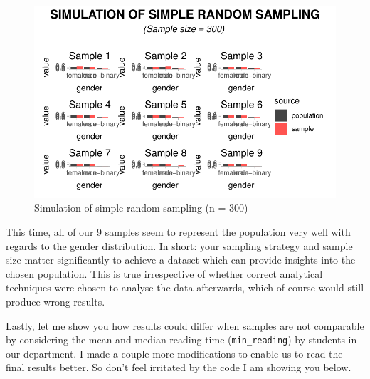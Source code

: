 \documentclass[
  letterpaper,
]{krantz}
\begin{document}
\begin{figure}[H]

{\centering \includegraphics{09_sources_of_bias_files/figure-pdf/drawing-samples-of-300-1.pdf}

}

\caption{Simulation of simple random sampling (n = 300)}

\end{figure}%

This time, all of our 9 samples seem to represent the population very
well with regards to the gender distribution. In short: your sampling
strategy and sample size matter significantly to achieve a dataset which
can provide insights into the chosen population. This is true
irrespective of whether correct analytical techniques were chosen to
analyse the data afterwards, which of course would still produce wrong
results.

Lastly, let me show you how results could differ when samples are not
comparable by considering the mean and median reading time
(\texttt{min\_reading}) by students in our department. I made a couple
more modifications to enable us to read the final results better. So
don't feel irritated by the code I am showing you below.
\end{document}

